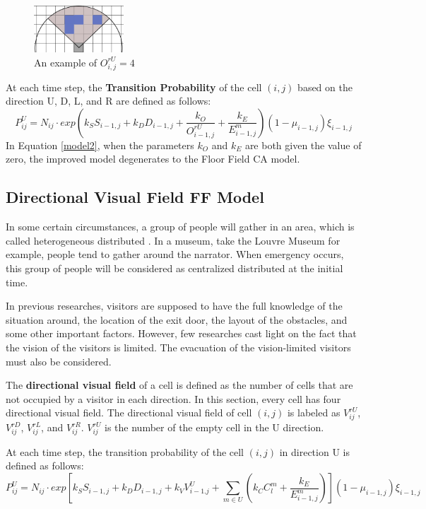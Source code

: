 \documentclass{mcmthesis}
\begin{document}
\begin{figure}[H]
	\centering
	\includegraphics[width=0.3\textwidth]{example-1.png}
      \captionsetup{font=small, labelfont=bf}
	\caption{An example of $O^{rU}_{i,j}=4$}
	\label{calU}
\end{figure}
At each time step, the \textbf{Transition Probability} of the cell $(i, j)$ based on the direction U, D, L, and R are defined as follows:
\begin{equation}
	P^U_{ij}=N_{ij}\cdot exp\left(k_SS_{i-1,j}+k_DD_{i-1,j}+\frac{k_O}{O^{rU}_{i-1,j}}+\frac{k_E}{E^m_{i-1,j}}\right)\left(1-\mu_{i-1,j}\right)\xi_{i-1,j}
	\label{model2}
\end{equation}
In Equation \eqref{model2}, when the parameters $k_O$ and $k_E$ are both given the value of zero, the improved model degenerates to the Floor Field CA model.


\subsection{Directional Visual Field FF Model}
In some certain circumstances, a group of people will gather in an area, which is called heterogeneous distributed \cite{148} . In a museum, take the Louvre Museum for example, people tend to gather around the narrator. When emergency occurs, this group of people will be considered as centralized distributed at the initial time.

In previous researches, visitors are supposed to have the full knowledge of the situation around, the location of the exit door, the layout of the obstacles, and some other important factors. However, few researches cast light on the fact that the vision of the visitors is limited. The evacuation of the vision-limited visitors must also be considered. \cite{70}

The \textbf{directional visual field} of a cell is defined as the number of cells that are not occupied by a visitor in each direction. In this section, every cell has four directional visual field. The directional visual field of cell $(i,j)$ is labeled as $V^{rU}_{ij}$, $V^{rD}_{ij}$, $V^{rL}_{ij}$, and $V^{rR}_{ij}$. $V^{rU}_{ij}$ is the number of the empty cell in the U direction. 

At each time step, the transition probability of the cell $(i,j)$ in direction U is defined as follows:
\begin{equation}
	P^U_{ij}=N_{ij}\cdot exp\left[k_SS_{i-1,j}+k_DD_{i-1,j}+k_VV^{U}_{i-1.j}+\sum_{m\in U}\left(k_CC^m_l+\frac{k_E}{E^m_{i-1,j}}\right)\right]\left(1-\mu_{i-1,j}\right)\xi_{i-1,j}
	\label{final}
\end{equation}
\end{document}
